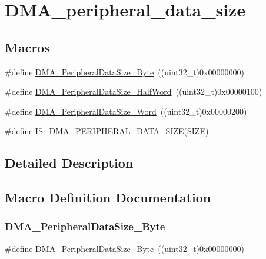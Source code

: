 \hypertarget{group___d_m_a__peripheral__data__size}{}\section{D\+M\+A\+\_\+peripheral\+\_\+data\+\_\+size}
\label{group___d_m_a__peripheral__data__size}
\subsection*{Macros}
\begin{DoxyCompactItemize}
\item 
\#define \mbox{\hyperlink{group___d_m_a__peripheral__data__size_ga7577035ae4ff413164000227a8cea346}{D\+M\+A\+\_\+\+Peripheral\+Data\+Size\+\_\+\+Byte}}~((uint32\+\_\+t)0x00000000)
\item 
\#define \mbox{\hyperlink{group___d_m_a__peripheral__data__size_gab1988e5005ee65c261018f62866e4585}{D\+M\+A\+\_\+\+Peripheral\+Data\+Size\+\_\+\+Half\+Word}}~((uint32\+\_\+t)0x00000100)
\item 
\#define \mbox{\hyperlink{group___d_m_a__peripheral__data__size_ga516ea7a40945d8325fe73e079b245ea1}{D\+M\+A\+\_\+\+Peripheral\+Data\+Size\+\_\+\+Word}}~((uint32\+\_\+t)0x00000200)
\item 
\#define \mbox{\hyperlink{group___d_m_a__peripheral__data__size_gad7916e0ae55cdf5efdfa68a09a028037}{I\+S\+\_\+\+D\+M\+A\+\_\+\+P\+E\+R\+I\+P\+H\+E\+R\+A\+L\+\_\+\+D\+A\+T\+A\+\_\+\+S\+I\+ZE}}(S\+I\+ZE)
\end{DoxyCompactItemize}


\subsection{Detailed Description}


\subsection{Macro Definition Documentation}
\mbox{\label{group___d_m_a__peripheral__data__size_ga7577035ae4ff413164000227a8cea346}} 
\subsubsection{\texorpdfstring{DMA\_PeripheralDataSize\_Byte}{DMA\_PeripheralDataSize\_Byte}}
{\footnotesize\ttfamily \#define D\+M\+A\+\_\+\+Peripheral\+Data\+Size\+\_\+\+Byte~((uint32\+\_\+t)0x00000000)}

